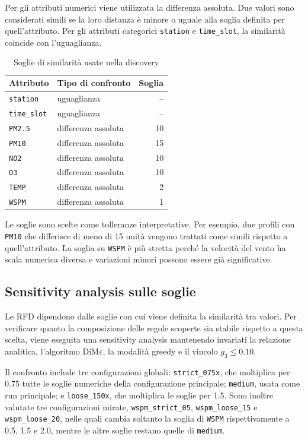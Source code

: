 \documentclass[a4paper,12pt]{article}
\newcommand{\Dime}{DiM\ensuremath{\varepsilon}}
\newcommand{\PMdue}{\texttt{PM2.5}}
\newcommand{\PMdieci}{\texttt{PM10}}
\newcommand{\NOdue}{\texttt{NO2}}
\newcommand{\Otre}{\texttt{O3}}
\newcommand{\Temp}{\texttt{TEMP}}
\newcommand{\Wspm}{\texttt{WSPM}}
\newcommand{\Station}{\texttt{station}}
\newcommand{\TimeSlot}{\texttt{time\_slot}}
\begin{document}
Per gli attributi numerici viene utilizzata la differenza assoluta. Due valori sono considerati simili se la loro distanza è minore o uguale alla soglia definita per quell'attributo. Per gli attributi categorici \Station{} e \TimeSlot, la similarità coincide con l'uguaglianza.

\begin{table}[H]
\centering
\caption{Soglie di similarità usate nella discovery}
\begin{tabular}{llr}
\toprule
Attributo & Tipo di confronto & Soglia \\
\midrule
\Station & uguaglianza & -- \\
\TimeSlot & uguaglianza & -- \\
\PMdue & differenza assoluta & 10 \\
\PMdieci & differenza assoluta & 15 \\
\NOdue & differenza assoluta & 10 \\
\Otre & differenza assoluta & 10 \\
\Temp & differenza assoluta & 2 \\
\Wspm & differenza assoluta & 1 \\
\bottomrule
\end{tabular}
\end{table}

Le soglie sono scelte come tolleranze interpretative. Per esempio, due profili con \PMdieci{} che differisce di meno di 15 unità vengono trattati come simili rispetto a quell'attributo. La soglia su \Wspm{} è più stretta perché la velocità del vento ha scala numerica diversa e variazioni minori possono essere già significative.

\subsection{Sensitivity analysis sulle soglie}

Le RFD dipendono dalle soglie con cui viene definita la similarità tra valori. Per verificare quanto la composizione delle regole scoperte sia stabile rispetto a questa scelta, viene eseguita una sensitivity analysis mantenendo invariati la relazione analitica, l'algoritmo \Dime, la modalità greedy e il vincolo $g_3 \leq 0.10$.

Il confronto include tre configurazioni globali: \texttt{strict\_075x}, che moltiplica per 0.75 tutte le soglie numeriche della configurazione principale; \texttt{medium}, usata come run principale; e \texttt{loose\_150x}, che moltiplica le soglie per 1.5. Sono inoltre valutate tre configurazioni mirate, \texttt{wspm\_strict\_05}, \texttt{wspm\_loose\_15} e \texttt{wspm\_loose\_20}, nelle quali cambia soltanto la soglia di \Wspm{} rispettivamente a 0.5, 1.5 e 2.0, mentre le altre soglie restano quelle di \texttt{medium}.
\end{document}
